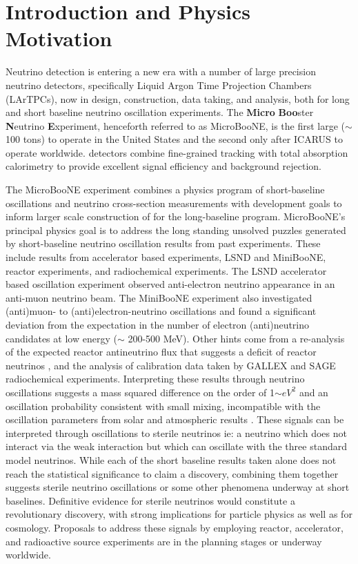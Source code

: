 \section{Introduction and Physics Motivation}

Neutrino detection is entering a new era with a number of large precision neutrino detectors, specifically Liquid Argon Time Projection Chambers (LArTPCs), now in design, construction, data taking, and analysis, both for long and short baseline neutrino oscillation experiments.  The {\bf{Micro}} {\bf{Boo}}ster {\bf{N}}eutrino {\bf{E}}xperiment, henceforth referred to as MicroBooNE, is the first large ($\sim$100 tons) \lartpc to operate in the United States and the second only after ICARUS to operate worldwide.  \lartpc detectors combine fine-grained tracking with total absorption calorimetry to provide excellent signal efficiency and background rejection.  

The MicroBooNE experiment combines a physics program of short-baseline oscillations and neutrino cross-section measurements with development goals to inform larger scale construction of \lartpcs for the long-baseline program.  MicroBooNE's principal physics goal is to address the long standing unsolved puzzles generated by short-baseline neutrino oscillation results from past experiments. These include results from accelerator based experiments, LSND and MiniBooNE, reactor experiments, and radiochemical experiments.  The LSND accelerator based oscillation experiment observed  anti-electron neutrino appearance in an anti-muon neutrino beam.  The MiniBooNE experiment \cite{miniboone} also investigated (anti)muon- to (anti)electron-neutrino oscillations and found a significant deviation from the expectation in the number of electron (anti)neutrino candidates at low energy ($\sim$ 200-500 MeV).  Other hints come from a re-analysis of the expected reactor antineutrino flux that suggests a deficit of reactor neutrinos \cite{reactor anomaly}, and the analysis of calibration data taken by GALLEX and SAGE \cite{gallexSage} radiochemical experiments.   Interpreting these results through neutrino oscillations suggests a mass squared difference on the order of 1$\sim eV^2$ and an oscillation probability consistent with small mixing, incompatible with the oscillation parameters from solar and atmospheric results \cite{solar}.  These signals can be interpreted through oscillations to sterile neutrinos ie: a neutrino which does not interact via the weak interaction but which can oscillate with the three standard model neutrinos.  While each of the short baseline results taken alone does not reach the statistical significance to claim a discovery, combining them together suggests sterile neutrino oscillations or some other phenomena underway at short baselines.   Definitive evidence for sterile neutrinos would constitute a revolutionary discovery, with strong implications for particle physics as well as for cosmology. Proposals to address these signals by employing reactor, accelerator, and radioactive source experiments are in the planning stages or underway worldwide.
   
